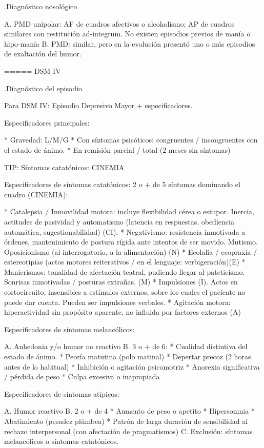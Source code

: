 \documentclass{scrbook}
\begin{document}
.Diagnóstico nosológico

A. PMD unipolar: AF de cuadros afectivos o alcoholismo; AP de cuadros similares con restitución ad-integrum. No existen episodios previos de manía o hipo-manía
B. PMD: similar, pero en la evolución presentó uno o más episodios de exaltación del humor.

===== DSM-IV

.Diagnóstico del episodio

Para DSM IV: Episodio Depresivo Mayor + especificadores.

Especificadores principales:

* Gravedad: L/M/G
* Con síntomas psicóticos: congruentes / incongruentes con el estado de ánimo.
* En remisión parcial / total (2 meses sin síntomas)

TIP: Síntomas catatónicos: CINEMIA

Especificadores de síntomas catatónicos: 2 o + de 5 síntomas dominando el cuadro (CINEMIA):

* Catalepsia / Inmovilidad motora: incluye flexibilidad cérea o estupor. Inercia, actitudes de pasividad y automatismo (latencia en respuestas, obediencia automática, sugestionabilidad) (CI).
* Negativismo: resistencia inmotivada a órdenes, mantenimiento de postura rígida ante intentos de ser movido. Mutismo. Oposicionismo (al interrogatorio, a la alimentación) (N)
* Ecolalia / ecopraxia / estereotipias (actos motores reiterativos / en el lenguaje: verbigeración)(E)
* Manierismos: tonalidad de afectación teatral, pudiendo llegar al pateticismo. Sonrisas inmotivadas / posturas extrañas. (M)
* Impulsiones (I). Actos en cortocircuito, insensibles a estímulos externos, sobre los cuales el paciente no puede dar cuenta. Pueden ser impulsiones verbales.
* Agitación motora: hiperactividad sin propósito aparente, no influida por factores externos (A)

Especificadores de síntomas melancólicos:

A. Anhedonia y/o humor no reactivo
B. 3 o + de 6:
* Cualidad distintiva del estado de ánimo.
* Peoría matutina (polo matinal)
* Depertar precoz (2 horas antes de lo habitual)
* Inhibición o agitación psicomotriz
* Anorexia significativa / pérdida de peso
* Culpa excesiva o inapropiada

Especificadores de síntomas atípicos:

A. Humor reactivo
B. 2 o + de 4
* Aumento de peso o apetito
* Hipersomnia
* Abatimiento (pesadez plúmbea)
* Patrón de larga duración de sensibilidad al rechazo interpersonal (con afectación de pragmatismos)
C. Exclusión: síntomas melancólicos o síntomas catatónicos.
\end{document}
